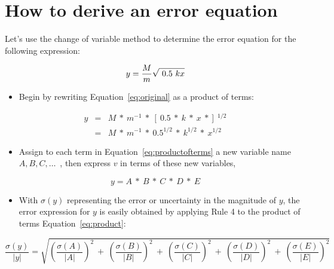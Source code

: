 \section*{How to derive an error equation}
Let's use the change of variable method to determine the error equation for the
following expression: 

\begin{equation}
  y = \frac{M}{m}\sqrt{~0.5~kx} \\
  \label{eq:original}
\end{equation}

\begin{itemize}
\item
Begin by rewriting Equation~\ref{eq:original} as a product of terms:
\end{itemize}
\begin{eqnarray}
  y & = & M~*~m^{-1}~*~ \left[~0.5~*~k~*~x~*\right]~^{1/2} \\ 
    & = & M~*~m^{-1}~*~0.5^{1/2}~*~k^{1/2}~*~x^{1/2}~ 
  \label{eq:productofterms}
\end{eqnarray}

\begin{itemize}
\item
Assign to each term in Equation~\ref{eq:productofterms} a new variable name 
$A,B,C,\dots$~, then express $v$ in terms of these new variables, 
\end{itemize}
\begin{equation}
  y = A~*~B~*~C~*~D~*~E
\label{eq:product}
\end{equation}

\begin{itemize}
\item
With $\sigma(y)$ representing the error or uncertainty in the magnitude of $y$,
the error expression for $y$ is easily obtained by applying Rule 4 to the 
product of terms Equation~\ref{eq:product}: 
\end{itemize}

\begin{equation}
  \frac{\sigma(y)}{|y|} = \sqrt{ \left(\frac{\sigma(A)}{|A|}\right)^2~+~\left(\frac{\sigma(B)}{|B|}\right)^2~+~
  \left(\frac{\sigma(C)}{|C|}\right)^2~+~\left(\frac{\sigma(D)}{|D|}\right)^2~+~\left(\frac{\sigma(E)}{|E|}\right)^2}
  \label{eq:productoferrors}
\end{equation}

